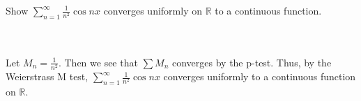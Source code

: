 Show $\sum_{n=1}^{\infty}\frac{1}{n^2}\cos nx$ converges uniformly on $\mathbb{R}$ to a continuous
function.\\\\

\begin{solution}\renewcommand{\qedsymbol}{}\ \\
    Let $M_n=\frac{1}{n^2}$. Then we see that $\sum M_n$ converges by the p-test. Thus, by the
    Weierstrass M test, $\sum_{n=1}^{\infty}\frac{1}{n^2}\cos nx$ converges uniformly to a continuous
    function on $\mathbb{R}$.

\end{solution}